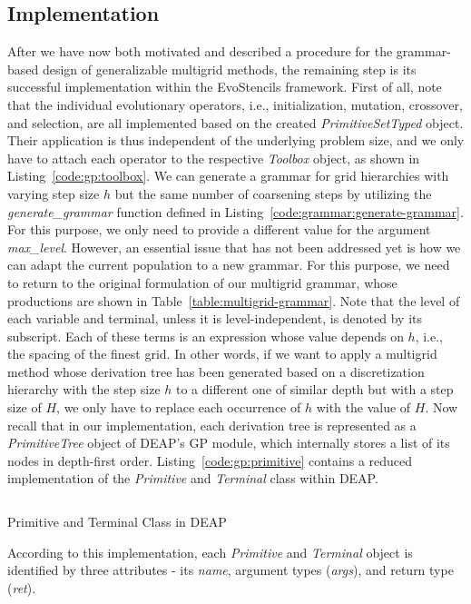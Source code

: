 \subsection{Implementation}
After we have now both motivated and described a procedure for the grammar-based design of generalizable multigrid methods, the remaining step is its successful implementation within the EvoStencils framework.
First of all, note that the individual evolutionary operators, i.e., initialization, mutation, crossover, and selection, are all implemented based on the created \emph{PrimitiveSetTyped} object. 
Their application is thus independent of the underlying problem size, and we only have to attach each operator to the respective \emph{Toolbox} object, as shown in Listing~\ref{code:gp:toolbox}.
We can generate a grammar for grid hierarchies with varying step size $h$ but the same number of coarsening steps by utilizing the \emph{generate\_grammar} function defined in Listing~\ref{code:grammar:generate-grammar}.
For this purpose, we only need to provide a different value for the argument \emph{max\_level}.
However, an essential issue that has not been addressed yet is how we can adapt the current population to a new grammar.
For this purpose, we need to return to the original formulation of our multigrid grammar, whose productions are shown in Table~\ref{table:multigrid-grammar}.
Note that the level of each variable and terminal, unless it is level-independent, is denoted by its subscript.
Each of these terms is an expression whose value depends on $h$, i.e., the spacing of the finest grid.
In other words, if we want to apply a multigrid method whose derivation tree has been generated based on a discretization hierarchy with the step size $h$ to a different one of similar depth but with a step size of $H$, we only have to replace each occurrence of $h$ with the value of $H$.
Now recall that in our implementation, each derivation tree is represented as a \emph{PrimitiveTree} object of DEAP's GP module, which internally stores a list of its nodes in depth-first order.
Listing~\ref{code:gp:primitive} contains a reduced implementation of the \emph{Primitive} and \emph{Terminal} class within DEAP.
\begin{listing}
	\inputminted{python}{evostencils/gp/primitive.py}
	\caption{Primitive and Terminal Class in DEAP}
	\label{code:gp:primitive}
\end{listing}
According to this implementation, each \emph{Primitive} and \emph{Terminal} object is identified by three attributes - its \emph{name}, argument types (\emph{args}), and return type (\emph{ret}).

